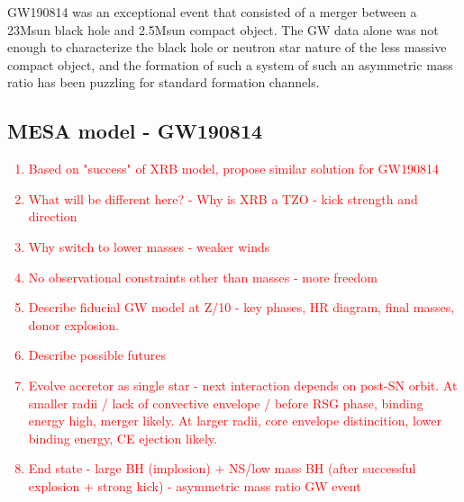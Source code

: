 \documentclass[linenumbers,trackchanges,twocolumn]{aastex701}
\newcommand{\red}{\textcolor{red}}
\begin{document}
GW190814 was an exceptional event that consisted of a merger between a 23Msun black hole and 2.5Msun compact object. The GW data alone was not enough to characterize the black hole or neutron star nature of the less massive compact object, and the formation of such a system of such an asymmetric mass ratio has been puzzling for standard formation channels.

\subsection{MESA model - GW190814}

\red{
\begin{enumerate}
    \item Based on "success" of XRB model, propose similar solution for GW190814
    \item What will be different here? - Why is XRB a TZO - kick strength and direction
    \item Why switch to lower masses - weaker winds
    \item No observational constraints other than masses - more freedom
    \item Describe fiducial GW model at Z/10 - key phases, HR diagram, final masses, donor explosion.
    \item Describe possible futures
    \item Evolve accretor as single star - next interaction depends on post-SN orbit. At smaller radii / lack of convective envelope / before RSG phase, binding energy high, merger likely. At larger radii, core envelope distincition, lower binding energy, CE ejection likely.
    \item End state - large BH (implosion) + NS/low mass BH (after successful explosion + strong kick) - asymmetric mass ratio GW event
\end{enumerate}
}
\end{document}
